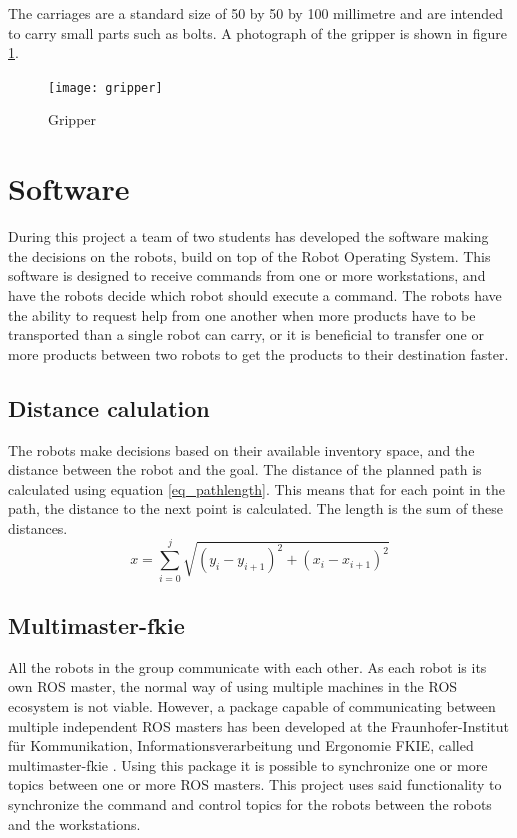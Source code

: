 \documentclass[10pt, journal]{IEEEtran}
\begin{document}
The carriages are a standard size of 50 by 50 by 100 millimetre and are intended to carry small parts such as bolts. A photograph of the gripper is shown in figure \ref{Gripper}.
\begin{figure}[htp]
\centering
\texttt{[image: gripper]}
\caption{Gripper}
\label{Gripper}
\end{figure}

\section{Software}
During this project a team of two students has developed the software making the decisions on the robots, build on top of the Robot Operating System. This software is designed to receive commands from one or more workstations, and have the robots decide which robot should execute a command. The robots have the ability to request help from one another when more products have to be transported than a single robot can carry, or it is beneficial to transfer one or more products between two robots to get the products to their destination faster.

\subsection{Distance calulation}
The robots make decisions based on their available inventory space, and the distance between the robot and the goal. The distance of the planned path is calculated using equation \ref{eq_pathlength}. This means that for each point in the path, the distance to the next point is calculated. The length is the sum of these distances.
\begin{equation}
\label{eq_pathlength}
x = \sum\limits_{i=0}^j \sqrt{(y_i - y_{i+1})^2 + (x_i - x_{i+1})^2}
\end{equation}

\subsection{Multimaster-fkie}
All the robots in the group communicate with each other. As each robot is its own ROS master, the normal\cite{ROSMultipleMachines} way of using multiple machines in the ROS ecosystem is not viable. However, a package capable of communicating between multiple independent ROS masters has been developed at the Fraunhofer-Institut f{\"u}r Kommunikation, Informationsverarbeitung und Ergonomie FKIE, called multimaster-fkie \cite{Multimaster-fkie}. Using this package it is possible to synchronize one or more topics between one or more ROS masters. This project uses said functionality to synchronize the command and control topics for the robots between the robots and the workstations.
\end{document}
